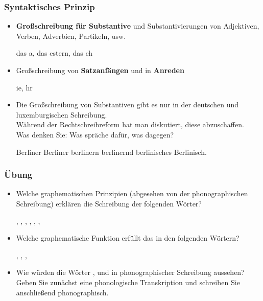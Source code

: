 \begin{frame}
\frametitle{Syntaktisches Prinzip}

\begin{itemize}
	\item \textbf{Großschreibung für Substantive} und Substantivierungen von Adjektiven, Verben, Adverbien, Partikeln, usw. 

	\ea das a, das estern, das ch
	\z 
	
	\item Großschreibung von \textbf{Satzanfängen} und in \textbf{Anreden}
	
	\ea {}ie, hr
	\z 

	
	\item Die Großschreibung von Substantiven gibt es nur in der deutschen und luxemburgischen Schreibung.\\
	Während der Rechtschreibreform hat man diskutiert, diese abzuschaffen.\\
	Was denken Sie: Was spräche dafür, was dagegen?

\pause 
	
	\ea Berliner Berliner berlinern berlinernd berlinisches Berlinisch.
	\z 
\end{itemize}

\end{frame}






\begin{frame}
\frametitle{Übung}

\begin{itemize}
	\item Welche graphematischen Prinzipien (abgesehen von der phonographischen Schreibung) erklären die Schreibung der folgenden Wörter?
	
	  \ea
          , , , , , , 
          \z

	\item Welche graphematische Funktion erfüllt das  in den folgenden Wörtern?
	
	  \ea
          , , , 
          \z
		
	\item Wie würden die Wörter ,  und  in phonographischer Schreibung aussehen? Geben Sie zunächst eine phonologische Transkription und schreiben Sie anschließend phonographisch.
\end{itemize}

\end{frame}


